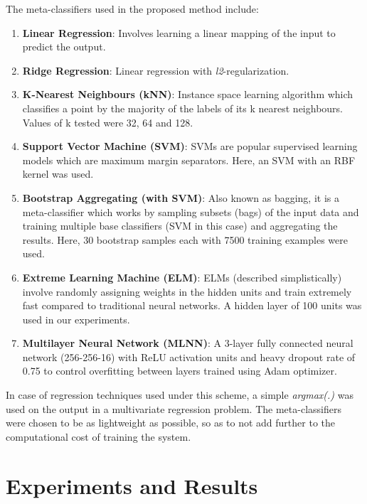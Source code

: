\documentclass[10pt,conference,a4paper]{IEEEtran}
\begin{document}
The meta-classifiers used in the proposed method include:
\begin{enumerate}
	\item \textbf{Linear Regression}: Involves learning a linear mapping of the input to predict the output.
	\item \textbf{Ridge Regression}: Linear regression with \textit{l2}-regularization.
	\item \textbf{K-Nearest Neighbours (kNN)}: Instance space learning algorithm which classifies a point by the majority of the labels of its k nearest neighbours. Values of k tested were 32, 64 and 128.
	\item \textbf{Support Vector Machine (SVM)}: SVMs are popular supervised learning models which are maximum margin separators. Here, an SVM with an RBF kernel was used.
	\item \textbf{Bootstrap Aggregating (with SVM)}: Also known as bagging, it is a meta-classifier which works by sampling subsets (bags) of the input data and training multiple base classifiers (SVM in this case) and aggregating the results. Here, 30 bootstrap samples each with 7500 training examples were used.
	\item \textbf{Extreme Learning Machine (ELM)}: ELMs (described simplistically) involve randomly assigning weights in the hidden units and train extremely fast compared to traditional neural networks. A hidden layer of 100 units was used in our experiments.
	\item \textbf{Multilayer Neural Network (MLNN)}: A 3-layer fully connected neural network (256-256-16) with ReLU activation units and heavy dropout rate of 0.75 to control overfitting between layers trained using Adam optimizer.
\end{enumerate}

In case of regression techniques used under this scheme, a simple \textit{argmax(.)} was used on the output in a multivariate regression problem. The meta-classifiers were chosen to be as lightweight as possible, so as to not add further to the computational cost of training the system.






\section{Experiments and Results}
\end{document}

